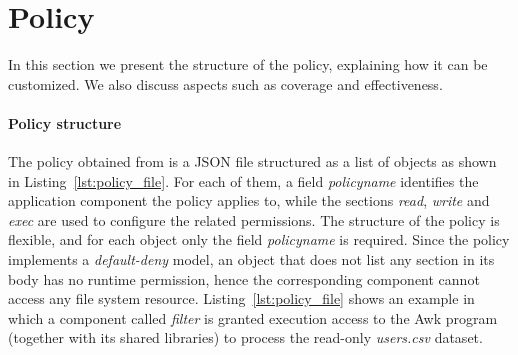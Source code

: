 \section{Policy}\label{sect:policy}

In this section we present the structure of the policy, explaining how
it can be customized. We also discuss aspects such as coverage and
effectiveness.

\paragraph*{Policy structure} The policy obtained from \dmng is a JSON
file structured as a list of objects as shown in
Listing~\ref{lst:policy_file}. For each of them, a field {\em
  policy\textunderscore name} identifies the application component the
policy applies to, while the sections {\em read}, {\em write} and {\em
  exec} are used to configure the related permissions. The structure
of the policy is flexible, and for each object only the field {\em
  policy\textunderscore name} is required. Since the policy implements
a \mbox{{\em default-deny}} model, an object that does not list any
section in its body has no runtime permission, hence the corresponding
component cannot access any file system
resource. Listing~\ref{lst:policy_file} shows an example in which a
component called {\em filter} is granted execution access to the Awk
program (together with its shared libraries) to process the
\mbox{read-only} {\em users.csv} dataset.

